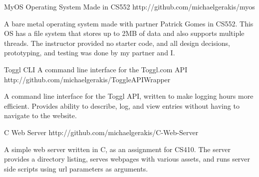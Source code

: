 


\begin{cvprojects}


\cvproject
{MyOS} %
{Operating System Made in CS552} %
{http://github.com/michaelgerakis/myos} %
{\begin{projectitem}
\item {A bare metal operating system made with partner Patrick Gomes in CS552.
This OS has a file system that stores up to 2MB of data and also supports
multiple threads. The instructor provided no starter code, and all design
decisions, prototyping, and testing was done by my partner and I.} %
\end{projectitem}
}


\cvproject
{Toggl CLI} %
{A command line interface for the Toggl.com API} %
{http://github.com/michaelgerakis/ToggleAPIWrapper} %
{\begin{projectitem}
\item {A command line interface for the Toggl API, written to make logging hours
more efficient. Provides ability to describe, log, and view entries without
having to navigate to the website.} %
\end{projectitem}
}


\cvproject
{C Web Server} %
{}  %
{http://github.com/michaelgerakis/C-Web-Server} %
{\begin{projectitem}
\item {A simple web server written in C, as an assignment for CS410. The server
provides a directory listing, serves webpages with various assets, and runs
server side scripts using url parameters as arguments.} %
\end{projectitem}
}


\end{cvprojects}
